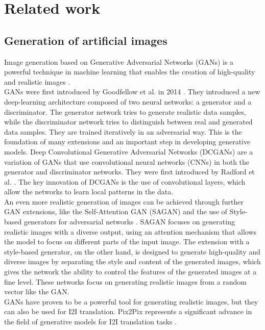 \chapter{Related work}\label{literaturereview}

\section{Generation of artificial images}\label{litrev_gans}
Image generation based on Generative Adversarial Networks (GANs) is a powerful technique in machine learning that enables the creation of high-quality and realistic images \cite{wang2018high}.\\
GANs were first introduced by Goodfellow et al. in 2014 \cite{Goodfellow2014}. 
They introduced a new deep-learning architecture composed of two neural networks: a generator and a discriminator.
The generator network tries to generate realistic data samples, while the discriminator network tries to distinguish between real and generated data samples.
They are trained iteratively in an adversarial way. This is the foundation of many extensions and an important step in developing generative models.
Deep Convolutional Generative Adversarial Networks (DCGANs) are a variation of GANs that use convolutional neural networks (CNNs) in both the generator and discriminator networks.
They were first introduced by Radford et al. \cite{Radford2015}.
The key innovation of DCGANs is the use of convolutional layers, which allow the networks to learn local patterns in the data.\\
An even more realistic generation of images can be achieved through further GAN extensions, like the Self-Attention GAN (SAGAN) \cite{Zhang2018} and the use of Style-based generators for adversarial networks \cite{Karras2018}.
SAGAN focuses on generating realistic images with a diverse output, using an attention mechanism that allows the model to focus on different parts of the input image. 
The extension with a style-based generator, on the other hand, is designed to generate high-quality and diverse images by separating the style and content of the generated images, which gives the network the ability to control the features of the generated images at a fine level.
These networks focus on generating realistic images from a random vector like the GAN.\\
GANs have proven to be a powerful tool for generating realistic images, but they can also be used for I2I translation.
Pix2Pix represents a significant advance in the field of generative models for I2I translation tasks \cite{isola2017image}.
